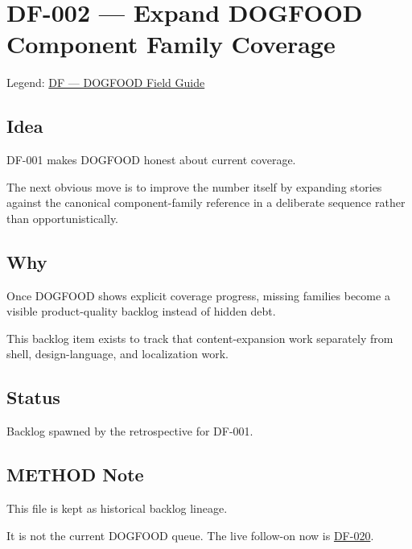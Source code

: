 \chapter{DF-002 --- Expand DOGFOOD Component Family Coverage}\label{record-290}

\smallskip

Legend: \href{https://github.com/flyingrobots/bijou/blob/cbd70612140e7a450d764b3c7be1c6af878b99bc/docs/method/graveyard/legends/DF-dogfood-field-guide.md}{DF --- DOGFOOD Field Guide}

\section{Idea}\label{record-290-idea}

DF-001 makes DOGFOOD honest about current coverage.

The next obvious move is to improve the number itself by expanding stories against the canonical component-family reference in a deliberate sequence rather than opportunistically.

\section{Why}\label{record-290-why}

Once DOGFOOD shows explicit coverage progress, missing families become a visible product-quality backlog instead of hidden debt.

This backlog item exists to track that content-expansion work separately from shell, design-language, and localization work.

\section{Status}\label{record-290-status}

Backlog spawned by the retrospective for DF-001.

\section{METHOD Note}\label{record-290-method-note}

This file is kept as historical backlog lineage.

It is not the current DOGFOOD queue. The live follow-on now is \href{https://github.com/flyingrobots/bijou/blob/cbd70612140e7a450d764b3c7be1c6af878b99bc/docs/method/graveyard/legacy-backlog/up-next/DF-020-deepen-dogfood-story-depth-and-variant-quality.md}{DF-020}.

